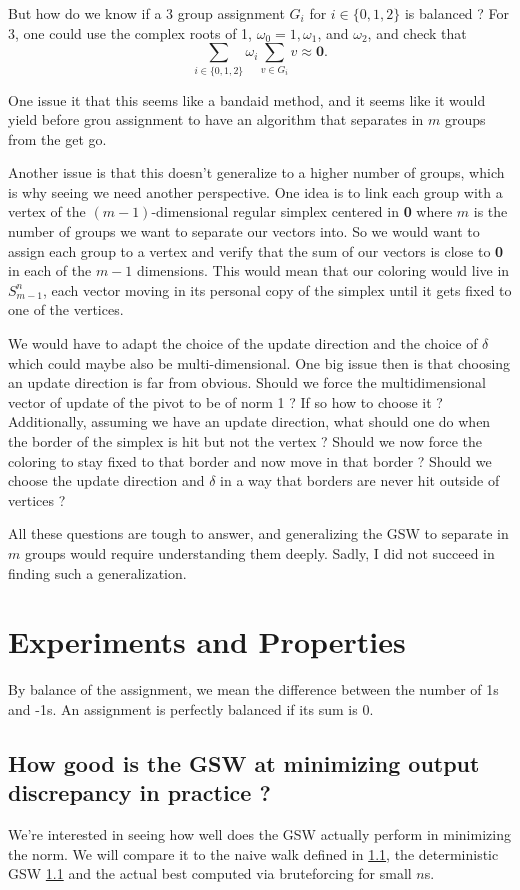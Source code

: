 \documentclass[12pt]{article}
\begin{document}
But how do we know if a 3 group assignment $G_i$ for $i\in\{0,1,2\}$ is balanced ? For 3, one could use the complex roots of 1, $\omega_0=1 ,\omega_1$, and $\omega_2$, and check that $$\sum_{i\in\{0,1,2\}}\omega_i\sum_{v\in G_i}v\approx\textbf{0}.$$

One issue it that this seems like a bandaid method, and it seems like it would yield before grou assignment to have an algorithm that separates in $m$ groups from the get go.

Another issue is that this doesn't generalize to a higher number of groups, which is why seeing we need another perspective. One  idea is to link each group with a vertex of the $(m-1)$-dimensional regular simplex centered in \textbf{0} where $m$ is the number of groups we want to separate our vectors into. So we would want to assign each group to a vertex and verify that the sum of our vectors is close to \textbf{0} in each of the $m-1$ dimensions. This would mean that our coloring would live in $S_{m-1}^n$, each vector moving in its personal copy of the simplex until it gets fixed to one of the vertices.

We would have to adapt the choice of the update direction and the choice of $\delta$ which could maybe also be multi-dimensional. One big issue then is that choosing an update direction is far from obvious. Should we force the multidimensional vector of update of the pivot to be of norm 1 ? If so how to choose it ? Additionally, assuming we have an update direction, what should one do when the border of the simplex is hit but not the vertex ? Should we now force the coloring to stay fixed to that border and now move in that border ? Should we choose the update direction and $\delta$ in a way that borders are never hit outside of vertices ?

All these questions are tough to answer, and generalizing the GSW to separate in $m$ groups would require understanding them deeply. Sadly, I did not succeed in finding such a generalization.

\section{Experiments and Properties}
By balance of the assignment, we mean the difference between the number of 1s and -1s. An assignment is perfectly balanced if its sum is 0.

\subsection{How good is the GSW at minimizing output discrepancy in practice ?}
We're interested in seeing how well does the GSW actually perform in minimizing the norm. We will compare it to the naive walk defined in \ref{}, the deterministic GSW \ref{} and the actual best computed via bruteforcing for small $n$s.
\end{document}
